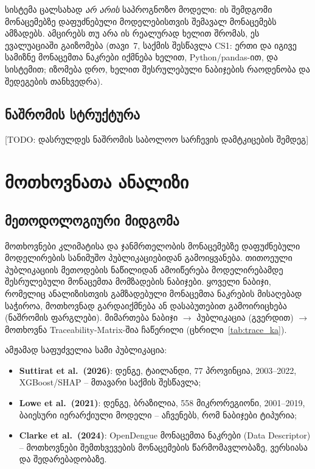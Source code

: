 \documentclass[11pt,a4paper]{article}
\newcommand{\todo}[1]{\textcolor{red!70!black}{[TODO: #1]}}
\begin{document}
სისტემა ცალსახად \emph{არ არის} საპროგნოზო მოდელი: ის შემდგომი
მონაცემებზე დაფუძნებული მოდელებისთვის შემავალ მონაცემებს ამზადებს. ამცირებს თუ
არა ის რეალურად ხელით შრომას, ეს ევალუაციაში გაიზომება (თავი~7, საქმის
შესწავლა CS1: ერთი და იგივე სამიზნე მონაცემთა ნაკრები იქმნება ხელით,
Python/pandas-ით, და სისტემით; იზომება დრო, ხელით შესრულებული ნაბიჯების
რაოდენობა და შედეგების თანხვედრა).

\subsection{ნაშრომის სტრუქტურა}
\todo{დასრულდეს ნაშრომის საბოლოო სარჩევის დამტკიცების შემდეგ}

\setcounter{section}{2}
\section{მოთხოვნათა ანალიზი}

\subsection{მეთოდოლოგიური მიდგომა}

მოთხოვნები კლიმატისა და ჯანმრთელობის მონაცემებზე დაფუძნებული მოდელირების
სანიმუშო პუბლიკაციებიდან გამოიყვანება. თითოეული პუბლიკაციის მეთოდების
ნაწილიდან ამოიწერება მოდელირებამდე შესრულებული მონაცემთა მომზადების ნაბიჯები.
ყოველი ნაბიჯი, რომელიც ანალიზისთვის გამზადებული მონაცემთა ნაკრების მისაღებად
საჭიროა, მოთხოვნად გარდაიქმნება ან დასაბუთებით გამოირიცხება (ნაშრომის
ფარგლები). მიმართება ნაბიჯი $\rightarrow$ პუბლიკაცია (გვერდით) $\rightarrow$
მოთხოვნა Traceability-Matrix-შია ჩაწერილი (ცხრილი~\ref{tab:trace_ka}).

ამჟამად საფუძველია სამი პუბლიკაცია:
\begin{itemize}[nosep]
  \item \textbf{Suttirat et al.\ (2026)}: დენგე, ტაილანდი, 77 პროვინცია,
        2003--2022, XGBoost/SHAP -- მთავარი საქმის შესწავლა;
  \item \textbf{Lowe et al.\ (2021)}: დენგე, ბრაზილია, 558 მიკრორეგიონი,
        2001--2019, ბაიესური იერარქიული მოდელი -- აჩვენებს, რომ ნაბიჯები
        ტიპურია;
  \item \textbf{Clarke et al.\ (2024)}: OpenDengue მონაცემთა ნაკრები (Data Descriptor) --
        მოთხოვნები შემთხვევების მონაცემების წარმომავლობაზე, ვერსიასა და შედარებადობაზე.
\end{itemize}
\end{document}
